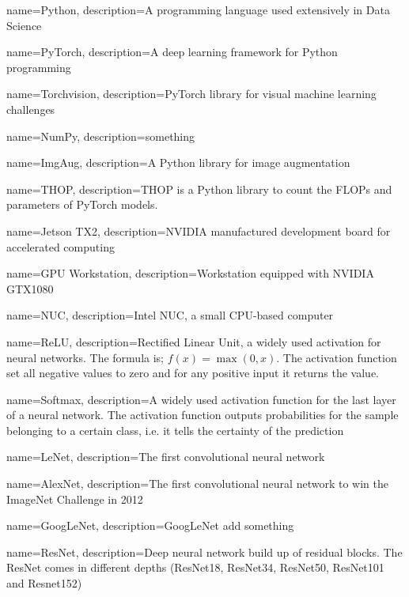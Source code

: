 {
	name=Python,
	description={A programming language used extensively in Data Science}
}

{
	name=PyTorch,
	description={A deep learning framework for Python programming}
}

{
	name={Torchvision},
	description={PyTorch library for visual machine learning challenges}
}

{
	name={NumPy},
	description={something}
}


{
	name={ImgAug},
	description={A Python library for image augmentation}
}

{
	name={THOP},
	description={THOP is a Python library to count the FLOPs and parameters of PyTorch models.}
}

{
	name=Jetson TX2,
	description={NVIDIA manufactured development board for accelerated computing}
}

{
	name={GPU Workstation},
	description={Workstation equipped with NVIDIA GTX1080}
}

{
	name={NUC},
	description={Intel NUC, a small CPU-based computer}
}


{
	name=ReLU,
	description={Rectified Linear Unit, a widely used activation for neural networks. The formula is; $f(x)=\max(0,x)$. The activation function set all negative values to zero and for any positive input it returns the value.}
}

{
	name=Softmax,
	description={A widely used activation function for the last layer of a neural network. The activation function outputs probabilities for the sample belonging to a certain class, i.e. it tells the certainty of the prediction}
}

{
	name={LeNet},
	description={The first convolutional neural network}
}

{
	name={AlexNet},
	description={The first convolutional neural network to win the ImageNet Challenge in 2012}
}

{
	name={GoogLeNet},
	description={GoogLeNet add something}
}

{
	name={ResNet},
	description={Deep neural network build up of residual blocks. The ResNet comes in different depths (ResNet18, ResNet34, ResNet50, ResNet101 and Resnet152)}
}

